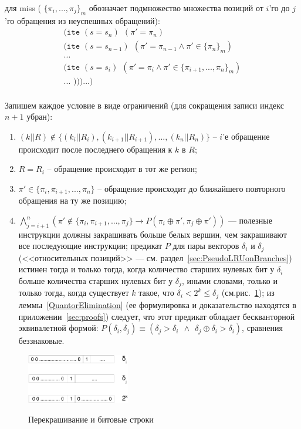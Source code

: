 для miss ( $\{\pi_i, ..., \pi_j\}_m$ обозначает подмножество множества позиций от $i$'го до $j$'го обращения из неуспешных обращений):
$$
\begin{array}{l}
\texttt{(ite~} (s = s_n) ~~ (\pi' = \pi_n)\\
\texttt{(ite~} (s = s_{n-1}) ~~ (\pi' = \pi_{n-1} \wedge \pi' \in \{\pi_n\}_m)\\
...\\
\texttt{(ite~} (s = s_i) ~~ (\pi' = \pi_i \wedge \pi' \in \{\pi_{i+1}, ..., \pi_n\}_m)\\
... \texttt{~)))...)}\\
\end{array}
$$

Запишем каждое условие в виде ограничений (для сокращения записи индекс $n+1$ убран):
\begin{enumerate}
    \item $(k||R) \notin \{(k_i||R_i), (k_{i+1}||R_{i+1}), ..., (k_n||R_n)\}$ --
$i$'е обращение происходит после последнего обращения к $k$ в $R$;
    \item $R = R_i$ -- обращение происходит в тот же регион;
    \item $\pi' \in \{\pi_i, \pi_{i+1}, ..., \pi_n\}$ -- обращение происходит до ближайшего повторного обращения на ту же позицию;
    \item $\bigwedge\limits_{j = i+1}^n (\pi' \notin \{\pi_i, \pi_{i+1}, ..., \pi_j\} \rightarrow P(\pi_i \oplus \pi', \pi_j \oplus \pi'))$ --- полезные инструкции должны закрашивать больше белых вершин, чем закрашивают все последующие инструкции;  предикат $P$ для пары векторов $\delta_i$ и $\delta_j$ (<<относительных позиций>> --- см. раздел~\ref{sec:PseudoLRUonBranches}) истинен тогда и только тогда, когда количество старших нулевых бит у $\delta_i$ больше количества старших нулевых бит у $\delta_j$, иными словами, только и только тогда, когда существует $k$ такое, что $\delta_i < 2^k \leqslant \delta_j$ (см.рис.~\ref{fig:bits}); из леммы~\ref{QuantorElimination} (ее формулировка и доказательство находятся в приложении~\ref{sec:proofs}) следует, что этот предикат обладает бескванторной эквивалетной формой: $P(\delta_i, \delta_j) \equiv (\delta_j > \delta_i~~\wedge~~\delta_j \oplus \delta_i > \delta_i)$, сравнения беззнаковые.
\end{enumerate}

\begin{figure}[h] \center
  \includegraphics[width=0.4\textwidth]{2.theor/bits}\\
  \caption{Перекрашивание и битовые строки}\label{fig:bits}
\end{figure}

